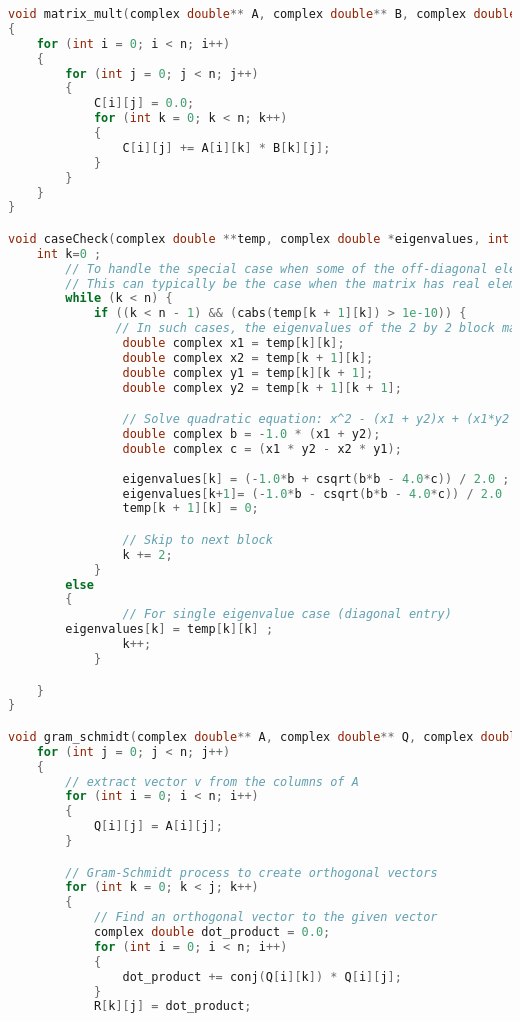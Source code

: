 \documentclass[report,12pt,onecolumn]{IEEEtran}
\theoremstyle{remark}
\begin{document}
\begin{itemize}
\begin{itemize}
\begin{lstlisting}[language = C]
void matrix_mult(complex double** A, complex double** B, complex double** C, int n) 
{
    for (int i = 0; i < n; i++) 
    {
        for (int j = 0; j < n; j++) 
        {
            C[i][j] = 0.0;
            for (int k = 0; k < n; k++) 
            {
                C[i][j] += A[i][k] * B[k][j];
            }
        }
    }
}

void caseCheck(complex double **temp, complex double *eigenvalues, int n) {
	int k=0 ;
        // To handle the special case when some of the off-diagonal elements are not zero.
        // This can typically be the case when the matrix has real elements, but has complex eigenvalues that are conjugates of each other.
        while (k < n) {
            if ((k < n - 1) && (cabs(temp[k + 1][k]) > 1e-10)) { 
               // In such cases, the eigenvalues of the 2 by 2 block matrix becomes the eigenvalues of the matrix, at that position.
                double complex x1 = temp[k][k];
                double complex x2 = temp[k + 1][k];
                double complex y1 = temp[k][k + 1];
                double complex y2 = temp[k + 1][k + 1];

                // Solve quadratic equation: x^2 - (x1 + y2)x + (x1*y2 - x2*y1) = 0
                double complex b = -1.0 * (x1 + y2);
                double complex c = (x1 * y2 - x2 * y1);
                
                eigenvalues[k] = (-1.0*b + csqrt(b*b - 4.0*c)) / 2.0 ;
                eigenvalues[k+1]= (-1.0*b - csqrt(b*b - 4.0*c)) / 2.0 ;
                temp[k + 1][k] = 0;

                // Skip to next block
                k += 2;
            } 
	    else 
	    {
                // For single eigenvalue case (diagonal entry)
		eigenvalues[k] = temp[k][k] ;
                k++;
            }

    }
}

void gram_schmidt(complex double** A, complex double** Q, complex double** R, int n) {
    for (int j = 0; j < n; j++) 
    {
        // extract vector v from the columns of A
        for (int i = 0; i < n; i++) 
        {
            Q[i][j] = A[i][j];
        }

        // Gram-Schmidt process to create orthogonal vectors
        for (int k = 0; k < j; k++) 
        {
            // Find an orthogonal vector to the given vector
            complex double dot_product = 0.0;
            for (int i = 0; i < n; i++) 
            {
                dot_product += conj(Q[i][k]) * Q[i][j];
            }
            R[k][j] = dot_product;


\end{lstlisting}
\end{itemize}
\end{itemize}
\end{document}
